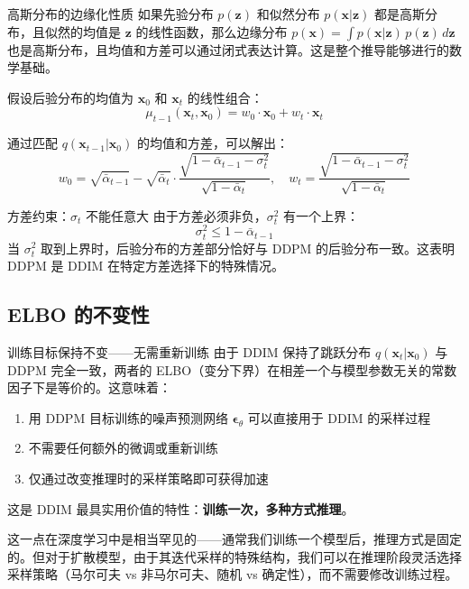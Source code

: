 \documentclass[a4paper]{article}
\begin{document}
\begin{knowledgebox}{高斯分布的边缘化性质}
如果先验分布 $p(\mathbf{z})$ 和似然分布 $p(\mathbf{x}|\mathbf{z})$ 都是高斯分布，且似然的均值是 $\mathbf{z}$ 的线性函数，那么边缘分布 $p(\mathbf{x}) = \int p(\mathbf{x}|\mathbf{z})\,p(\mathbf{z})\,d\mathbf{z}$ 也是高斯分布，且均值和方差可以通过闭式表达计算。这是整个推导能够进行的数学基础。
\end{knowledgebox}

假设后验分布的均值为 $\mathbf{x}_0$ 和 $\mathbf{x}_t$ 的线性组合：
$$
\mu_{t-1}(\mathbf{x}_t, \mathbf{x}_0) = w_0 \cdot \mathbf{x}_0 + w_t \cdot \mathbf{x}_t
$$

通过匹配 $q(\mathbf{x}_{t-1}|\mathbf{x}_0)$ 的均值和方差，可以解出：
$$
w_0 = \sqrt{\bar{\alpha}_{t-1}} - \sqrt{\bar{\alpha}_t} \cdot \frac{\sqrt{1-\bar{\alpha}_{t-1}-\sigma_t^2}}{\sqrt{1-\bar{\alpha}_t}}, \quad
w_t = \frac{\sqrt{1-\bar{\alpha}_{t-1}-\sigma_t^2}}{\sqrt{1-\bar{\alpha}_t}}
$$

\begin{warningbox}{方差约束：$\sigma_t$ 不能任意大}
由于方差必须非负，$\sigma_t^2$ 有一个上界：
$$
\sigma_t^2 \leq 1 - \bar{\alpha}_{t-1}
$$
当 $\sigma_t^2$ 取到上界时，后验分布的方差部分恰好与 DDPM 的后验分布一致。这表明 DDPM 是 DDIM 在特定方差选择下的特殊情况。
\end{warningbox}

\subsection{ELBO 的不变性}

\begin{importantbox}{训练目标保持不变——无需重新训练}
由于 DDIM 保持了跳跃分布 $q(\mathbf{x}_t|\mathbf{x}_0)$ 与 DDPM 完全一致，两者的 ELBO（变分下界）在相差一个与模型参数无关的常数因子下是等价的。这意味着：
\begin{enumerate}
    \item 用 DDPM 目标训练的噪声预测网络 $\boldsymbol{\epsilon}_\theta$ 可以直接用于 DDIM 的采样过程
    \item 不需要任何额外的微调或重新训练
    \item 仅通过改变推理时的采样策略即可获得加速
\end{enumerate}
这是 DDIM 最具实用价值的特性：\textbf{训练一次，多种方式推理}。
\end{importantbox}

这一点在深度学习中是相当罕见的——通常我们训练一个模型后，推理方式是固定的。但对于扩散模型，由于其迭代采样的特殊结构，我们可以在推理阶段灵活选择采样策略（马尔可夫 vs 非马尔可夫、随机 vs 确定性），而不需要修改训练过程。
\end{document}
